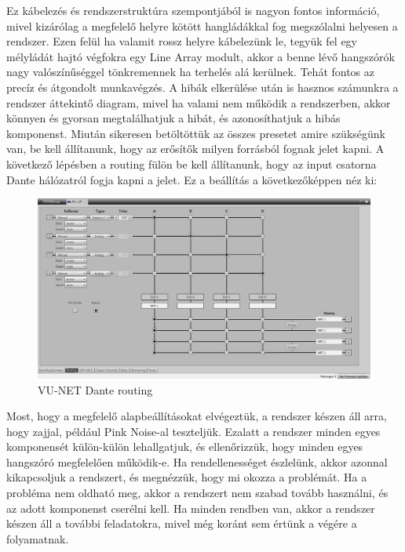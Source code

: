 Ez kábelezés és rendszerstruktúra szempontjából is nagyon fontos információ, mivel kizárólag a megfelelő helyre
kötött hangládákkal fog megszólalni helyesen a rendszer. Ezen felül ha valamit rossz helyre kábelezünk le, tegyük fel egy
mélyládát hajtó végfokra egy Line Array modult, akkor a benne lévő hangszórók nagy valószínűséggel tönkremennek ha terhelés alá kerülnek.
Tehát fontos az precíz és átgondolt munkavégzés. A hibák elkerülése után is hasznos számunkra a rendszer áttekintő diagram,
mivel ha valami nem működik a rendszerben, akkor könnyen és gyorsan megtalálhatjuk a hibát, és azonosíthatjuk a hibás komponenst.
Miután sikeresen betöltöttük az összes presetet amire szükségünk van, be kell állítanunk, hogy az erősítők milyen forrásból
fognak jelet kapni. A következő lépésben a routing fülön be kell állítanunk, hogy az input csatorna Dante hálózatról fogja kapni a jelet.
Ez a beállítás a következőképpen néz ki:
\begin{figure}[H]
	\centering
	\includegraphics[width=\textwidth, keepaspectratio]{figures/vunet_routing_dante.png}
	\caption{VU-NET Dante routing}\label{fig:vunet_routing_dante}
\end{figure}
Most, hogy a megfelelő alapbeállításokat elvégeztük, a rendszer készen áll arra, hogy zajjal, például
Pink Noise-al teszteljük. Ezalatt a rendszer minden egyes komponensét külön-külön lehallgatjuk, és ellenőrizzük,
hogy minden egyes hangszóró megfelelően működik-e. Ha rendellenességet észlelünk, akkor azonnal kikapcsoljuk a rendszert,
és megnézzük, hogy mi okozza a problémát. Ha a probléma nem oldható meg, akkor a rendszert nem szabad tovább használni,
és az adott komponenst cserélni kell. Ha minden rendben van, akkor a rendszer készen áll a további feladatokra, mivel
még koránt sem értünk a végére a folyamatnak.
